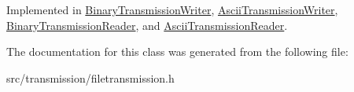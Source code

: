 Implemented in \hyperlink{classBinaryTransmissionWriter_a40cc3d88d6501af5db2ed2acd05caacc}{Binary\+Transmission\+Writer}, \hyperlink{classAsciiTransmissionWriter_af9a2b271e8e051b7dbd266ba8207b4e7}{Ascii\+Transmission\+Writer}, \hyperlink{classBinaryTransmissionReader_a28c85fe81913ccb4ba6aee44d84dbf7d}{Binary\+Transmission\+Reader}, and \hyperlink{classAsciiTransmissionReader_ab0c198c17eded2a978d974c01aebae37}{Ascii\+Transmission\+Reader}.



The documentation for this class was generated from the following file\+:\begin{DoxyCompactItemize}
\item 
src/transmission/filetransmission.\+h\end{DoxyCompactItemize}
